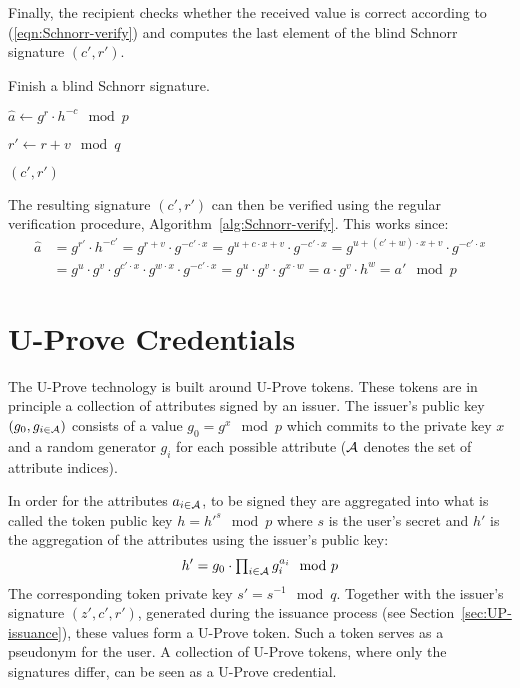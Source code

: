 Finally, the recipient checks whether the received value is correct according to
(\ref{eqn:Schnorr-verify}) and computes the last element of the blind Schnorr
signature $(c', r')$.

\begin{algorithm}
  \caption{Finish a blind Schnorr signature.}
  \label{alg:Schnorr-finish}
  \addtolength{\baselineskip}{1mm}
  \begin{algorithmic}[1]
      \State $\hat{a} \gets g^r \cdot h^{-c} \mod p$
        \Return {}
      \EndIf

      \State $r' \gets r + v \mod q$

      \Return $(c', r')$
    \EndFunction
  \end{algorithmic}
\end{algorithm}

The resulting signature $(c', r')$ can then be verified using the regular
verification procedure, Algorithm~\ref{alg:Schnorr-verify}. This works since:
\begin{align*}
  \hat{a}
  & = g^{r'} \cdot h^{-c'}
  = g^{r + v} \cdot g^{-c' \cdot x}
  = g^{u + c \cdot x + v} \cdot g^{-c' \cdot x}
  = g^{u + (c' + w) \cdot x + v} \cdot g^{-c' \cdot x} \\
  & = g^u \cdot g^v \cdot g^{c' \cdot x} \cdot g^{w \cdot x} \cdot g^{-c' \cdot x}
  = g^u \cdot g^v \cdot g^{x \cdot w}
  = a \cdot g^v \cdot h^w
  = a' \mod p
\end{align*}

\section{U-Prove Credentials}

The U-Prove technology is built around U-Prove tokens. These tokens are in
principle a collection of attributes signed by an issuer. The issuer's public
key $(g_0, g_{i \in \mathcal{A}})$ consists of a value $g_0 = g^x \mod p$ which commits
to the private key $x$ and a random generator $g_i$ for each possible attribute
($\mathcal{A}$ denotes the set of attribute indices).

In order for the attributes $a_{i \in \mathcal{A}}$, to be signed they are aggregated
into what is called the token public key $h = h'^s \mod p$ where $s$ is the
user's secret and $h'$ is the aggregation of the attributes using the issuer's
public key:
\begin{equation}\label{eqn:UP-attribute-aggregation}
  h' = g_0 \cdot \textstyle\prod_{i \in \mathcal{A}} g_i^{a_i} \mod p
\end{equation}
The corresponding token private key $s' = s^{-1} \mod q$. Together with the
issuer's signature $(z', c', r')$, generated during the issuance process (see
Section~\ref{sec:UP-issuance}), these values form a U-Prove token. Such a token
serves as a pseudonym for the user. A collection of U-Prove tokens, where only
the signatures differ, can be seen as a U-Prove credential.

